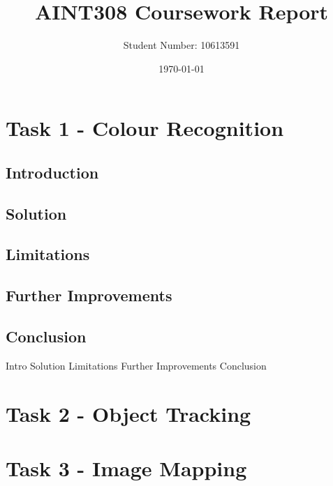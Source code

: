 \documentclass{article}
\begin{document}
\title{AINT308 Coursework Report}
\author{Student Number: 10613591}
\date{\today}
\maketitle

\newpage

\tableofcontents

\newpage

\begin{abstract}

\end{abstract}

\section{Task 1 - Colour Recognition}
\subsection{Introduction}
\subsection{Solution}
\subsection{Limitations}
\subsection{Further Improvements}
\subsection{Conclusion}
Intro
Solution
Limitations
Further Improvements
Conclusion 
\section{Task 2 - Object Tracking}

\section{Task 3 - Image Mapping}


\end{document}
